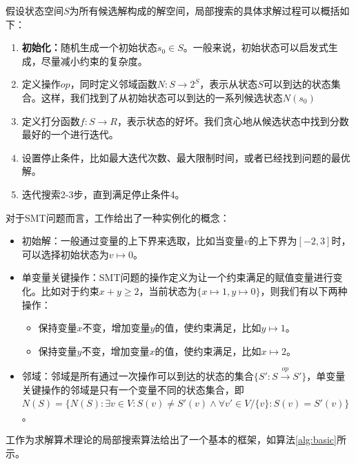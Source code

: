 假设状态空间$S$为所有候选解构成的解空间，局部搜索的具体求解过程可以概括如下：
\begin{enumerate}
    \item \textbf{初始化：}随机生成一个初始状态$s_0 \in S$。一般来说，初始状态可以启发式生成，尽量减小约束的复杂度。
    \item 定义操作$op$，同时定义邻域函数$N: S \rightarrow 2^S$，表示从状态$S$可以到达的状态集合。这样，我们找到了从初始状态可以到达的一系列候选状态$N(s_0)$
    \item 定义打分函数$f: S \rightarrow R$，表示状态的好坏。我们贪心地从候选状态中找到分数最好的一个进行迭代。
    \item 设置停止条件，比如最大迭代次数、最大限制时间，或者已经找到问题的最优解。
    \item 迭代搜索2-3步，直到满足停止条件4。
\end{enumerate}
对于SMT问题而言，工作\cite{CaiLZ2023}给出了一种实例化的概念：
\begin{itemize}
    \item 初始解：一般通过变量的上下界来选取，比如当变量$v$的上下界为$[-2, 3]$时，可以选择初始状态为$v \mapsto 0$。
    \item 单变量关键操作：SMT问题的操作定义为让一个约束满足的赋值变量进行变化。比如对于约束$x + y \geq 2$，当前状态为$\{x \mapsto 1, y \mapsto 0\}$，则我们有以下两种操作：
    \begin{itemize}
        \item 保持变量$x$不变，增加变量$y$的值，使约束满足，比如$y \mapsto 1$。
        \item 保持变量$y$不变，增加变量$x$的值，使约束满足，比如$x \mapsto 2$。
    \end{itemize}

    \item 邻域：邻域是所有通过一次操作可以到达的状态的集合$\{S' : S \xrightarrow{op} S'\}$，单变量关键操作的邻域是只有一个变量不同的状态集合，即$N(S) = \{N(S): \exists v \in V: S(v) \neq S'(v) \land \forall v' \in V / \{v\}: S(v) = S'(v) \}$。
\end{itemize}

工作\cite{CaiLZ2023}为求解算术理论的局部搜索算法给出了一个基本的框架，如算法\ref{alg:basic}所示。


